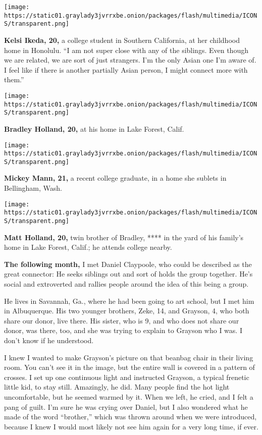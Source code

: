 \texttt{[image: https://static01.graylady3jvrrxbe.onion/packages/flash/multimedia/ICONS/transparent.png]}

\textbf{Kelsi Ikeda, 20,} a college student in Southern California, at
her childhood home in Honolulu. ``I am not super close with any of the
siblings. Even though we are related, we are sort of just strangers. I'm
the only Asian one I'm aware of. I feel like if there is another
partially Asian person, I might connect more with them.''

\texttt{[image: https://static01.graylady3jvrrxbe.onion/packages/flash/multimedia/ICONS/transparent.png]}

\textbf{Bradley Holland, 20,} at his home in Lake Forest, Calif.

\texttt{[image: https://static01.graylady3jvrrxbe.onion/packages/flash/multimedia/ICONS/transparent.png]}

\textbf{Mickey Mann, 21,} a recent college graduate, in a home she
sublets in Bellingham, Wash.

\texttt{[image: https://static01.graylady3jvrrxbe.onion/packages/flash/multimedia/ICONS/transparent.png]}

\textbf{Matt Holland, 20,} twin brother of Bradley, **** in the yard of
his family's home in Lake Forest, Calif.; he attends college nearby.

\textbf{The following month,} I met Daniel Claypoole, who could be
described as the great connector: He seeks siblings out and sort of
holds the group together. He's social and extroverted and rallies people
around the idea of this being a group.

He lives in Savannah, Ga., where he had been going to art school, but I
met him in Albuquerque. His two younger brothers, Zeke, 14, and Grayson,
4, who both share our donor, live there. His sister, who is 9, and who
does not share our donor, was there, too, and she was trying to explain
to Grayson who I was. I don't know if he understood.

I knew I wanted to make Grayson's picture on that beanbag chair in their
living room. You can't see it in the image, but the entire wall is
covered in a pattern of crosses. I set up one continuous light and
instructed Grayson, a typical frenetic little kid, to stay still.
Amazingly, he did. Many people find the hot light uncomfortable, but he
seemed warmed by it. When we left, he cried, and I felt a pang of guilt.
I'm sure he was crying over Daniel, but I also wondered what he made of
the word ``brother,'' which was thrown around when we were introduced,
because I knew I would most likely not see him again for a very long
time, if ever.

